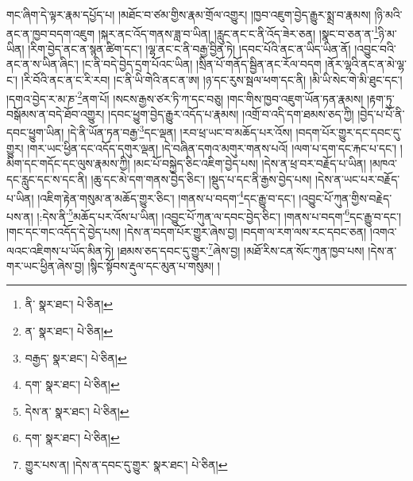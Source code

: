 གང་ཞིག་དེ་ལྟར་རྣམ་དཔྱོད་པ། །མཐོང་བ་ཙམ་གྱིས་རྣམ་གྲོལ་འགྱུར། །ཁྱབ་འཇུག་བྱེད་རྒྱུར་སྨྲ་བ་རྣམས། །ཉི་མའི་ནང་ན་ཁྱབ་བདག་འཇུག །སྐར་ནང་འོད་གནས་ཟླ་བ་ཡིན། །རླུང་ནང་ང་ནི་འོད་ཟེར་ཅན། །སྣང་བ་ཅན་ན་\footnote{ནི་  སྣར་ཐང་།  པེ་ཅིན། }ཉི་མ་ཡིན། །རིག་བྱེད་ནང་ན་སྙན་ཚིག་དང་། །ལྷ་ནང་ང་ནི་བརྒྱ་བྱིན་ཏེ། །དབང་པོའི་ནང་ན་ཡིད་ཡིན་ནོ། །འབྱུང་བའི་ནང་ན་ས་ཡིན་ཞིང་། །ང་ནི་བདེ་བྱེད་དྲག་པོའང་ཡིན། །སྲིན་པོ་གནོད་སྦྱིན་ནང་རོལ་བདག །ནོར་ལྷའི་ནང་ན་མེ་ལྷ་ང་། །རི་བོའི་ནང་ན་ང་རི་རབ། །ང་ནི་ཡི་གེའི་ནང་ན་ཨ། །ཉ་དང་རུས་སྦལ་ཕག་དང་ནི། །མི་ཡི་སེང་གེ་མི་ཐུང་དང་། །དགའ་བྱེད་ར་མ་ཎ་\footnote{ན་  སྣར་ཐང་།  པེ་ཅིན། }ནག་པོ། །སངས་རྒྱས་ཙར་ཏི་ཀ་དང་བཅུ། །གང་གིས་ཁྱབ་འཇུག་ཡོན་ཏན་རྣམས། །རྟག་ཏུ་བསྒོམས་ན་བདེ་ཐོབ་འགྱུར། །དབང་ཕྱུག་བྱེད་རྒྱུར་འདོད་པ་རྣམས། །འགྲོ་བ་འདི་དག་ཐམས་ཅད་ཀྱི། །བྱེད་པ་པོ་ནི་དབང་ཕྱུག་ཡིན། །དེ་ནི་ཡོན་ཏན་བརྒྱ་\footnote{བརྒྱད་  སྣར་ཐང་།  པེ་ཅིན། }དང་ལྡན། །རབ་ཕྲ་ཡང་བ་མཆོད་པར་འོས། །བདག་པོར་གྱུར་དང་དབང་དུ་གྱུར། །གར་ཡང་ཕྱིན་དང་འདོད་དགུར་ལྡན། །དེ་བཞིན་དགའ་མགུར་གནས་པའོ། །ལག་པ་དག་དང་རྐང་པ་དང་། །མིག་དང་གདོང་དང་ལུས་རྣམས་ཀྱི། །མང་པོ་བསྐྱེད་ཅིང་འཇིག་བྱེད་པས། །དེས་ན་ཕྲ་བར་བརྗོད་པ་ཡིན། །མཁའ་དང་རླུང་དང་ས་དང་ནི། །ཆུ་དང་མེ་དག་གནས་བྱེད་ཅིང་། །སྡུད་པ་དང་ནི་རྒྱས་བྱེད་པས། །དེས་ན་ཡང་པར་བརྗོད་པ་ཡིན། །འཇིག་རྟེན་གསུམ་ན་མཆོད་གྱུར་ཅིང་། །གནས་པ་བདག་\footnote{དག་  སྣར་ཐང་།  པེ་ཅིན། }དང་རྒྱུ་བ་དང་། །འབྱུང་པོ་ཀུན་གྱིས་བརྗེད་པས་ན། །:དེས་ནི་\footnote{དེས་ན་  སྣར་ཐང་།  པེ་ཅིན། }མཆོད་པར་འོས་པ་ཡིན། །འབྱུང་པོ་ཀུན་ལ་དབང་བྱེད་ཅིང་། །གནས་པ་བདག་\footnote{དག་  སྣར་ཐང་།  པེ་ཅིན། }དང་རྒྱུ་བ་དང་། །གང་དང་གང་འདོད་དེ་བྱེད་པས། །དེས་ན་བདག་པོར་གྱུར་ཞེས་བྱ། །བདག་ལ་རག་ལས་རང་དབང་ཅན། །འགའ་ལའང་འཇིགས་པ་ཡོད་མིན་ཏེ། །ཐམས་ཅད་དབང་དུ་གྱུར་\footnote{གྱུར་པས་ན། །དེས་ན་དབང་དུ་གྱུར་  སྣར་ཐང་།  པེ་ཅིན། }ཞེས་བྱ། །མཐོ་རིས་ངན་སོང་ཀུན་ཁྱབ་པས། །དེས་ན་གར་ཡང་ཕྱིན་ཞེས་བྱ། །སྙིང་སྟོབས་རྡུལ་དང་མུན་པ་གསུམ། །
